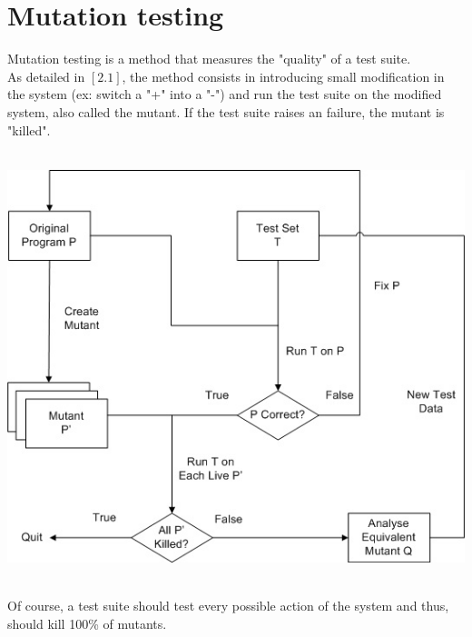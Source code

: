 \documentclass[a4paper]{report}
\begin{document}
\section*{Mutation testing}
Mutation testing is a method that measures the "quality" of a test suite.\\
As detailed in $[2.1]$, the method consists in introducing small modification in the system (ex: switch a "+" into a "-") and run the test suite on the modified system, also called the mutant. If the test suite raises an failure, the mutant is "killed".\\
\newline
$ $\\
\centerline{
  \includegraphics[scale=0.5]{img/mutation.jpg}
}
$ $\\
\newline
Of course, a test suite should test every possible action of the system and thus, should kill 100\% of mutants.
\end{document}

